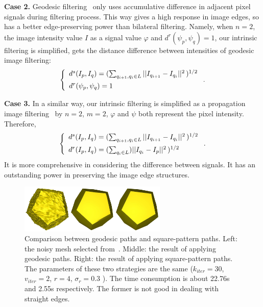 {\bfseries Case 2.}
Geodesic filtering~\cite{grazzini2009edge} only uses accumulative difference in adjacent pixel signals during filtering process.
This way gives a high response in image edges, so has a better edge-preserving power than bilateral filtering.
Namely, when $n=2$, the image intensity value $I$ as a signal value $\varphi$ and $d^{r}(\psi_p, \psi_q) = 1$,
our intrinsic filtering is simplified, gets the distance difference between intensities of geodesic image filtering:
 \begin{equation}
 \label{Eq:GeodesicDistance}
 \left \{
 \begin{array}{ll}
        d^{s}(I_p,I_q) = (\sum_{q_{i+1}, q_i \in{L}}||I_{q_{i+1}} - I_{q_i}||^{2}\,)^{1/2} \vspace{1.5mm} \\
        d^{r}(\psi_p, \psi_q) = 1 \\
 \end{array}
 \right. .
 \end{equation}

{\bfseries Case 3.}
In a similar way, our intrinsic filtering is simplified as a propagation image filtering~\cite{Chang2015propagated} by $n=2$, $m=2$, $\varphi$ and $\psi$ both represent the pixel intensity.
Therefore,
 \begin{equation}
 \label{Eq:PropagationDistance}
 \left \{
 \begin{array}{ll}
        d^{s}(I_p, I_q) = (\sum_{q_{i+1}, q_i \in{L}}||I_{q_{i+1}} - I_{q_i}||^{2}\,)^{1/2} \vspace{1.5mm}\\
        d^{r}(I_p, I_q) = (\sum_{{q_i} \in{L}})||I_{q_i} - I_p||^2\,)^{1/2} \\
 \end{array}
 \right. .
 \end{equation}
It is more comprehensive in considering the difference between signals.
It has an outstanding power in preserving the image edge structures.


\begin{figure}
\centering
\includegraphics[width = 7.0cm]{results/shortest/shortest.jpg}
\vspace{-0.5mm}
\caption{ Comparison between geodesic paths and square-pattern paths. Left: the noisy mesh selected from~\cite{Wang2014decoupling}. Middle: the result of applying geodesic paths. Right: the result of applying square-pattern paths. The parameters of these two strategies are the same ($k_{iter} = 30$, $v_{iter} = 2$, $r = 4$, $\sigma_r = 0.3$ ). The time consumption is about 22.76s and 2.55s respectively. The former is not good in dealing with straight edges.}
\label{Fig:shortestpath}
\end{figure}

